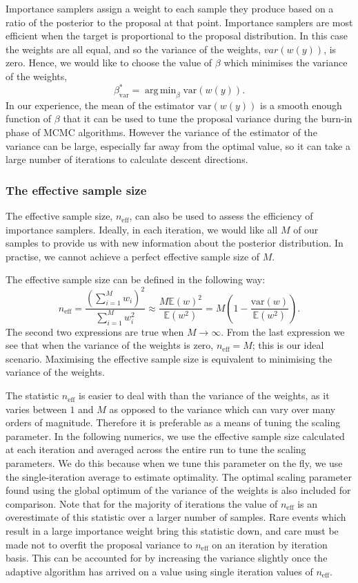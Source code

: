 \documentclass[final]{siamltex}
\newcommand{\neff}{n_{\text{eff}}}
\newcommand{\E}{{\mathbb E}}
\DeclareMathOperator*{\argmin}{arg\,min}
\begin{document}
Importance samplers assign a weight to each sample they produce based
on a ratio of the posterior to the proposal at that point. Importance
samplers are most efficient when the target is proportional to the
proposal distribution. In this case the weights are all equal, and so the variance of the weights, $var(w(y))$, is zero. Hence, we would like to choose the value of $\beta$ which minimises the variance of the weights,
\[
	\beta^*_{\text{var}} = \argmin_{\beta} \text{var}(w(y)).
\]
In our experience, the mean of the estimator
$\text{var}(w(y))$ is a smooth enough function of $\beta$ that it can
be used to tune the proposal variance during the burn-in phase of MCMC
algorithms. However the variance of the estimator of the variance can be large, especially far away from the optimal value, so it can take a large number of iterations to calculate descent directions.

\subsubsection{The effective sample size}\label{sec:ess}

The effective sample size, $\neff$, can also be used to assess the efficiency of importance samplers. Ideally, in each iteration, we would like all $M$ of our samples to provide us with new information about the posterior distribution. In practise, we cannot achieve a perfect effective sample size of $M$.

The effective sample size can be defined in the following way:
\[
	\neff = \frac{\left(\sum_{i=1}^M \! w_i\right)^2}{\sum_{i=1}^M \! w_i^2} \approx \frac{M\E(w)^2}{\E(w^2)} = M\left(1 - \frac{\mbox{var}(w)}{\mathbb{E}(w^2)}\right).
\]
The second two expressions are true when $M\rightarrow\infty$. From
the last expression we see that when the variance of the weights is
zero, $\neff = M$; this is our ideal scenario. Maximising the effective sample size is equivalent to minimising the variance of the weights.

The statistic $\neff$ is easier to deal with than the variance of the
weights, as it varies between $1$ and $M$ as opposed to the variance
which can vary over many orders of magnitude.
Therefore it is preferable as a means of tuning the scaling
parameter. In the following numerics, we use the effective sample size
calculated at each iteration and averaged across the entire run to
tune the scaling parameters. We do this because when we tune this
parameter on the fly, we use the single-iteration average to estimate
optimality. The optimal scaling parameter found using the global
optimum of the variance of the weights is also included for
comparison. Note that for the majority of iterations the value of
$\neff$ is an overestimate of this statistic over a larger number of
samples. Rare events which result in a large importance weight bring
this statistic down, and care must be made not to overfit the proposal
variance to $\neff$ on an iteration by iteration basis. This can be
accounted for by increasing the variance slightly once the adaptive
algorithm has arrived on a value using single iteration values of $\neff$.
\end{document}
